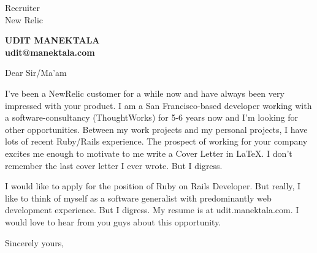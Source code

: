\documentclass[11pt]{letter} %
\begin{document}
\signature{Udit Manektala}                  %
\longindentation=0pt                       %
\let\raggedleft\raggedright                %
 
\begin{letter}{Recruiter\\
New Relic} 

\begin{center}
\large\bf UDIT MANEKTALA\\
udit@manektala.com\\
\end{center} 
\vfill %


 
\opening{Dear Sir/Ma'am} 
 
\noindent I've been a NewRelic customer for a while now and have always been very impressed with your product. I am a San Francisco-based developer working with a software-consultancy (ThoughtWorks) for 5-6 years now and I'm looking for other opportunities. Between my work projects and my personal projects, I have lots of recent Ruby/Rails experience. The prospect of working for your company excites me enough to motivate to me write a Cover Letter in LaTeX. I don't remember the last cover letter I ever wrote. But I digress. 

I would like to apply for the position of Ruby on Rails Developer. But really, I like to think of myself as a software generalist with predominantly web development experience. But I digress. My resume is at udit.manektala.com. I would love to hear from you guys about this opportunity.
 
\closing{Sincerely yours,}
 
 

\end{letter}
 
\end{document}
